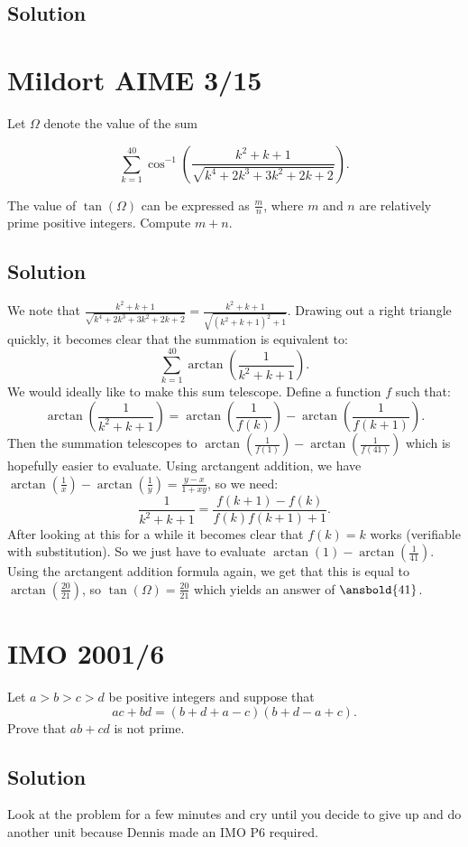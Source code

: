 \documentclass{article}
\begin{document}
\subsection{Solution}

\pagebreak\section{Mildort AIME 3/15}
Let $\Omega$ denote the value of the sum

\[\sum\limits_{k=1}^{40} \cos^{-1}\left(\frac{k^2 + k + 1}{\sqrt{k^4 + 2k^3 + 3k^2 + 2k + 2}}\right).\]

The value of $\tan\left(\Omega\right)$ can be expressed as $\frac{m}{n}$, where $m$ and $n$ are relatively prime positive integers. Compute $m + n$.

\subsection{Solution}
We note that $\frac{k^2+k+1}{\sqrt{k^4+2k^3+3k^2+2k+2}}=\frac{k^2+k+1}{\sqrt{(k^2+k+1)^2+1}}$. Drawing out a right triangle quickly, it becomes clear that the summation is equivalent to:
$$\sum_{k=1}^{40} \arctan \left(\frac{1}{k^2+k+1} \right).$$
We would ideally like to make this sum telescope. Define a function $f$ such that:
$$\arctan \left(\frac{1}{k^2+k+1}\right)=\arctan \left(\frac{1}{f(k)}\right)-\arctan \left(\frac{1}{f(k+1)}\right).$$
Then the summation telescopes to $\arctan \left(\frac{1}{f(1)}\right)-\arctan \left(\frac{1}{f(41)}\right)$ which is hopefully easier to evaluate. Using arctangent addition, we have $\arctan \left(\frac{1}{x}\right)-\arctan \left(\frac{1}{y}\right)=\frac{y-x}{1+xy}$, so we need:
$$\frac{1}{k^2+k+1}=\frac{f(k+1)-f(k)}{f(k)f(k+1)+1}.$$
After looking at this for a while it becomes clear that $f(k)=k$ works (verifiable with substitution). So we just have to evaluate $\arctan(1)-\arctan \left(\frac{1}{41}\right)$. Using the arctangent addition formula again, we get that this is equal to $\arctan \left(\frac{20}{21}\right)$, so $\tan (\Omega)=\frac{20}{21}$ which yields an answer of $\ansbold{41}$.

\pagebreak\section{IMO 2001/6}
Let $a > b > c > d$ be positive integers and suppose that \[ ac + bd = (b+d+a-c)(b+d-a+c). \] Prove that $ab + cd$ is not prime.

\subsection{Solution}
Look at the problem for a few minutes and cry until you decide to give up and do another unit because Dennis made an IMO P6 required.
\end{document}

